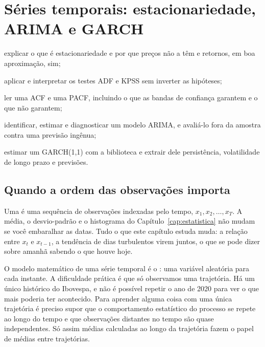 \chapter{Séries temporais: estacionariedade, ARIMA e GARCH}
\label{cap:series}


\begin{objetivos}
  \item explicar o que é estacionariedade e por que preços não a têm e retornos, em boa aproximação, sim;
  \item aplicar e interpretar os testes ADF e KPSS sem inverter as hipóteses;
  \item ler uma ACF e uma PACF, incluindo o que as bandas de confiança garantem e o que não garantem;
  \item identificar, estimar e diagnosticar um modelo ARIMA, e avaliá-lo fora da amostra contra uma previsão ingênua;
  \item estimar um GARCH(1,1) com a biblioteca  e extrair dele persistência, volatilidade de longo prazo e previsões.
\end{objetivos}

\section{Quando a ordem das observações importa}

Uma  é uma sequência de observações indexadas pelo tempo, $x_1, x_2, \dots, x_T$. A média, o desvio-padrão e o histograma do Capítulo~\ref{cap:estatistica} não mudam se você embaralhar as datas. Tudo o que este capítulo estuda muda: a relação entre $x_t$ e $x_{t-1}$, a tendência de dias turbulentos virem juntos, o que se pode dizer sobre amanhã sabendo o que houve hoje.

O modelo matemático de uma série temporal é o : uma variável aleatória para cada instante. A dificuldade prática é que só observamos uma trajetória. Há um único histórico do Ibovespa, e não é possível repetir o ano de 2020 para ver o que mais poderia ter acontecido. Para aprender alguma coisa com uma única trajetória é preciso supor que o comportamento estatístico do processo se repete ao longo do tempo e que observações distantes no tempo são quase independentes. Só assim médias calculadas ao longo da trajetória fazem o papel de médias entre trajetórias.

